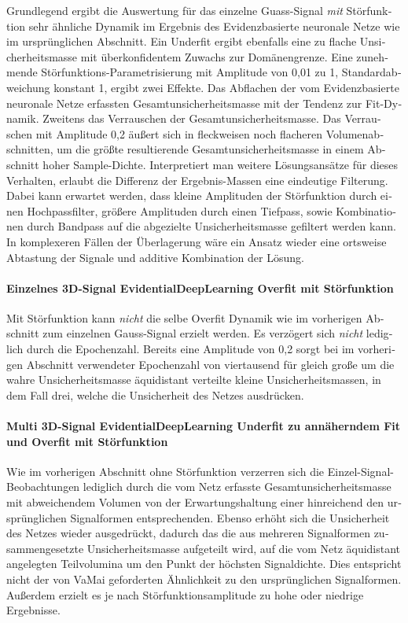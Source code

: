 \begin{otherlanguage}{ngerman}
Grundlegend ergibt die Auswertung für das einzelne Guass-Signal \textit{mit} Störfunktion sehr ähnliche Dynamik im Ergebnis des \gls{Evidenzbasierte neuronale Netze} wie im ursprünglichen Abschnitt. Ein Underfit ergibt ebenfalls eine zu flache Unsicherheitsmasse mit überkonfidentem Zuwachs zur Domänengrenze. Eine zunehmende Störfunktions-Parametrisierung mit Amplitude von 0,01 zu 1, Standardabweichung konstant 1, ergibt zwei Effekte. Das Abflachen der vom \gls{Evidenzbasierte neuronale Netze} erfassten Gesamtunsicherheitsmasse mit der Tendenz zur Fit-Dynamik. Zweitens das Verrauschen der Gesamtunsicherheitsmasse. Das Verrauschen mit Amplitude 0,2 äußert sich in fleckweisen noch flacheren Volumenabschnitten, um die größte resultierende Gesamtunsicherheitsmasse in einem Abschnitt hoher Sample-Dichte. Interpretiert man weitere Lösungsansätze für dieses Verhalten, erlaubt die Differenz der Ergebnis-Massen eine eindeutige Filterung. Dabei kann erwartet werden, dass kleine Amplituden der Störfunktion durch einen Hochpassfilter, größere Amplituden durch einen Tiefpass, sowie Kombinationen durch Bandpass auf die abgezielte Unsicherheitsmasse gefiltert werden kann. In komplexeren Fällen der Überlagerung wäre ein Ansatz wieder eine ortsweise Abtastung der Signale und additive Kombination der Lösung. 



\paragraph{Einzelnes 3D-Signal \gls{EvidentialDeepLearning} Overfit mit Störfunktion}

Mit Störfunktion kann \textit{nicht} die selbe Overfit Dynamik wie im vorherigen Abschnitt zum einzelnen Gauss-Signal erzielt werden. Es verzögert sich \textit{nicht} lediglich durch die Epochenzahl. Bereits eine Amplitude von 0,2 sorgt bei im vorherigen Abschnitt verwendeter Epochenzahl von viertausend für gleich große um die wahre Unsicherheitsmasse äquidistant verteilte kleine Unsicherheitsmassen, in dem Fall drei, welche die Unsicherheit des Netzes ausdrücken. 



\paragraph{Multi 3D-Signal \gls{EvidentialDeepLearning} Underfit zu annäherndem Fit und Overfit mit Störfunktion} 

Wie im vorherigen Abschnitt ohne Störfunktion verzerren sich die Einzel-Signal-Beobachtungen lediglich durch die vom Netz erfasste Gesamtunsicherheitsmasse mit abweichendem Volumen von der Erwartungshaltung einer hinreichend den ursprünglichen Signalformen entsprechenden.  Ebenso erhöht sich die Unsicherheit des Netzes wieder ausgedrückt, dadurch das die aus mehreren Signalformen zusammengesetzte Unsicherheitsmasse aufgeteilt wird, auf die vom Netz äquidistant angelegten Teilvolumina um den Punkt der höchsten Signaldichte. Dies entspricht nicht der von VaMai geforderten Ähnlichkeit zu den ursprünglichen Signalformen. Außerdem erzielt es je nach Störfunktionsamplitude zu hohe oder niedrige Ergebnisse. 




\end{otherlanguage}
